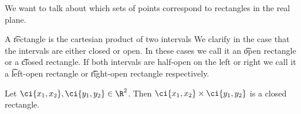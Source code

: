 

We want to talk about which sets of points correspond to rectangles in the real plane.


A \t{rectangle} is the cartesian product of two intervals
We clarify in the case that the intervals are either closed or open.
In these cases we call it an \t{open rectangle} or a \t{closed rectangle}.
If both intervals are half-open on the left or right we call it a \t{left-open rectangle} or \t{right-open rectangle} respectively.


Let $\ci{x_1, x_2},\ci{y_1,y_2}\in\R^2$.
Then $\ci{x_1, x_2} \times \ci{y_1,y_2}$ is a closed rectangle.

\blankpage
